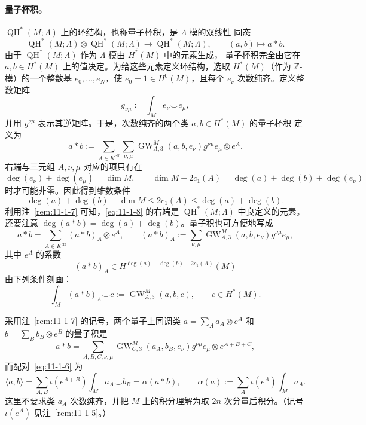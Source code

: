 \paragraph{量子杯积。}
$\operatorname{QH}^*(M;\Lambda)$ 上的环结构，也称量子杯积，是 $\Lambda$-模的双线性
同态
\[
  \operatorname{QH}^*(M;\Lambda)\otimes
  \operatorname{QH}^*(M;\Lambda)
  \longrightarrow\operatorname{QH}^*(M;\Lambda),
  \qquad(a,b)\longmapsto a*b.
\]
由于 $\operatorname{QH}^*(M;\Lambda)$ 作为 $\Lambda$-模由 $H^*(M)$ 中的元素生成，
量子杯积完全由它在 $a,b\in H^*(M)$ 上的值决定。为给这些元素定义环结构，选取
$H^*(M)$（作为 $\mathbb Z$-模）的一个整数基 $e_0,\ldots,e_N$，使
$e_0=1\in H^0(M)$，且每个 $e_\nu$ 次数纯齐。定义整数矩阵
\[
  g_{\nu\mu}:=\int_Me_\nu\smile e_\mu,
\]
并用 $g^{\nu\mu}$ 表示其逆矩阵。于是，次数纯齐的两个类 $a,b\in H^*(M)$ 的量子杯积
定义为
\begin{equation}\label{eq:11-1-8}
  a*b:=\sum_{A\in K^{\mathrm{eff}}}\sum_{\nu,\mu}
  \operatorname{GW}_{A,3}^M(a,b,e_\nu)g^{\nu\mu}e_\mu\otimes e^A.
\end{equation}
右端与三元组 $A,\nu,\mu$ 对应的项只有在
\[
  \deg(e_\nu)+\deg(e_\mu)=\dim M,\qquad
  \dim M+2c_1(A)=\deg(a)+\deg(b)+\deg(e_\nu)
\]
时才可能非零。因此得到维数条件
\[
  \deg(a)+\deg(b)-\dim M\le2c_1(A)\le\deg(a)+\deg(b).
\]
利用注~\ref{rem:11-1-7} 可知，\eqref{eq:11-1-8} 的右端是
$\operatorname{QH}^*(M;\Lambda)$ 中良定义的元素。还要注意
$\deg(a*b)=\deg(a)+\deg(b)$。量子积也可方便地写成
\[
  a*b=\sum_{A\in K^{\mathrm{eff}}}(a*b)_A\otimes e^A,\qquad
  (a*b)_A:=\sum_{\nu,\mu}
  \operatorname{GW}_{A,3}^M(a,b,e_\nu)g^{\nu\mu}e_\mu,
\]
其中 $e^A$ 的系数
\[
  (a*b)_A\in H^{\deg(a)+\deg(b)-2c_1(A)}(M)
\]
由下列条件刻画：
\begin{equation}\label{eq:11-1-9}
  \int_M(a*b)_A\smile c
  :=\operatorname{GW}_{A,3}^M(a,b,c),
  \qquad c\in H^*(M).
\end{equation}

\begin{remark}\label{rem:11-1-8}
采用注~\ref{rem:11-1-7} 的记号，两个量子上同调类
$a=\sum_Aa_A\otimes e^A$ 和 $b=\sum_Bb_B\otimes e^B$ 的量子积是
\[
  a*b=\sum_{A,B,C,\nu,\mu}
  \operatorname{GW}_{C,3}^M(a_A,b_B,e_\nu)g^{\nu\mu}e_\mu
  \otimes e^{A+B+C},
\]
而配对~\eqref{eq:11-1-6} 为
\[
  \langle a,b\rangle
  =\sum_{A,B}\iota(e^{A+B})\int_Ma_A\smile b_B
  =\alpha(a*b),
  \qquad
  \alpha(a):=\sum_A\iota(e^A)\int_Ma_A.
\]
这里不要求类 $a_A$ 次数纯齐，并把 $M$ 上的积分理解为取 $2n$ 次分量后积分。（记号
$\iota(e^A)$ 见注~\ref{rem:11-1-5}。）
\end{remark}

